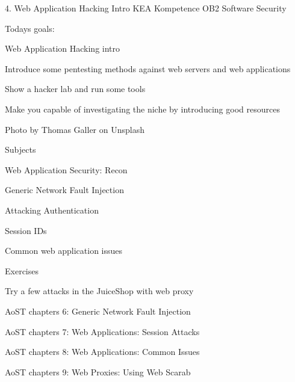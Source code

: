 \documentclass[Screen16to9,17pt]{foils}
\begin{document}
\mytitlepage
{4. Web Application Hacking Intro}
{KEA Kompetence OB2 Software Security}



Todays goals:
\begin{list2}
\item Web Application Hacking intro
\item Introduce some pentesting methods against web servers and web applications
\item Show a hacker lab and run some tools
\item Make you capable of investigating the niche by introducing good resources
\end{list2}

Photo by Thomas Galler on Unsplash



\begin{list1}
\item Subjects
\item Web Application Security: Recon
\begin{list2}
\item Generic Network Fault Injection
\item Attacking Authentication
\item Session IDs
\item Common web application issues
\end{list2}
\item Exercises
\begin{list2}
\item  Try a few attacks in the JuiceShop with web proxy
\end{list2}
\end{list1}


\begin{list1}
\item AoST chapters 6: Generic Network Fault Injection
\item AoST chapters 7: Web Applications: Session  Attacks
\item AoST chapters 8: Web Applications: Common Issues
\item AoST chapters 9: Web Proxies: Using Web Scarab
\end{list1}



\end{document}
